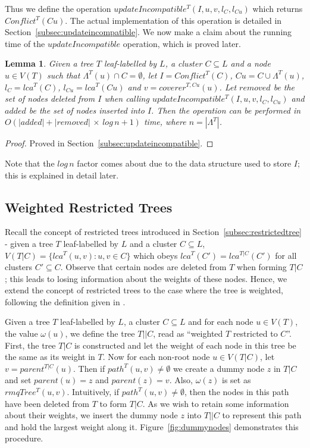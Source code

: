 \documentclass[final,1p,times]{elsarticle}
\newcommand{\leafset}{\Lambda}
\newcommand{\weight}{\omega}
\newtheorem{lemma}[theorem]{Lemma}
\begin{document}
    Thus we define the operation $updateIncompatible^{T}(I, u, v, l_C, l_{Cu})$ which returns $Conflict^{T}(Cu)$. The actual implementation of this operation is detailed in Section~\ref{subsec:updateincompatible}. We now make a claim about the running time of the $updateIncompatible$ operation, which is proved later.
    \newline

    \begin{lemma}
        \label{lem:updateincompatibleruntime}
        Given a tree $T$ leaf-labelled by $L$, a cluster $C \subseteq L$ and a node $u \in V(T)$ such that $\leafset^{T}(u) \cap C = \emptyset$, let $I = Conflict^{T}(C)$, $Cu = C \cup \leafset^{T}(u)$, $l_C = lca^{T}(C)$, $l_{Cu} = lca^{T}(Cu)$ and $v = coverer^{T, Cu}(u)$. Let $removed$ be the set of nodes deleted from $I$ when calling $updateIncompatible^{T}(I, u, v, l_C, l_{Cu})$ and $added$ be the set of nodes inserted into $I$. Then the operation can be performed in $O(|added| + |removed|\,\times\,log\,n + 1)$ time, where $n = |\leafset^{T}|$.
    \end{lemma}
        \begin{proof}
            Proved in Section~\ref{subsec:updateincompatible}.
        \end{proof}

    Note that the $log\,n$ factor comes about due to the data structure used to store $I$; this is explained in detail later.

    \subsection{Weighted Restricted Trees}
    \label{subsec:restrictedweighted}

    Recall the concept of restricted trees introduced in Section~\ref{subsec:restrictedtree} - given a tree $T$ leaf-labelled by $L$ and a cluster $C \subseteq L$, $V(T|C) = \{lca^T(u, v) : u, v \in C\}$ which obeys $lca^T(C') = lca^{T|C}(C')$ for all clusters $C' \subseteq C$. Observe that certain nodes are deleted from $T$ when forming $T|C$; this leads to losing information about the weights of these nodes. Hence, we extend the concept of restricted trees to the case where the tree is weighted, following the definition given in \cite{jansson2018algorithms}.

    Given a tree $T$ leaf-labelled by $L$, a cluster $C \subseteq L$ and for each node $u \in V(T)$, the value $\weight(u)$, we define the tree $T||C$, read as ``weighted $T$ restricted to $C$''. First, the tree $T|C$ is constructed and let the weight of each node in this tree be the same as its weight in $T$. Now for each non-root node $u \in V(T|C)$, let $v = parent^{T|C}(u)$. Then if $path^{T}(u, v) \neq \emptyset$ we create a dummy node $z$ in $T|C$ and set $parent(u) = z$ and $parent(z) = v$. Also, $\weight(z)$ is set as $rmqTree^{T}(u, v)$. Intuitively, if $path^{T}(u, v) \neq \emptyset$, then the nodes in this path have been deleted from $T$ to form $T|C$. As we wish to retain some information about their weights, we insert the dummy node $z$ into $T||C$ to represent this path and hold the largest weight along it. Figure~\ref{fig:dummynodes} demonstrates this procedure.
\end{document}
